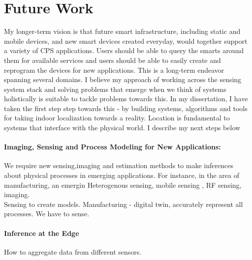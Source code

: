 \documentclass[11pt]{article}
\begin{document}
\section{Future Work}
My longer-term vision is that future smart infrastructure, including static and mobile devices, and new smart devices created everyday, would together support a variety of CPS applications. Users should be able to query the smarts around them for available services and users should be able to easily create and reprogram the devices for new applications.  This is a long-term endeavor spanning several domains.  I believe my approach of working across the sensing system stack and solving problems that emerge when we think of systems holistically is suitable to tackle problems towards this. In my dissertation, I have taken the first step step towards this - by building systems, algorithms and tools for taking indoor localization towards a reality. Location is fundamental to systems that interface with the physical world.  I describe my next steps below\\


\paragraph{Imaging, Sensing and Process Modeling for New Applications: }
We require new sensing,imaging and estimation methods to make inferences about physical processes in emerging applications. For instance, in the area of manufacturing, an emergin
Heterogenous sensing, mobile sensing , RF sensing, imaging.\\
Sensing to create models. Manufacturing - digital twin, accurately represent all processes. We have to sense.

\paragraph{Inference at the Edge}
How to aggregate data from different sensors.\\
\end{document}
